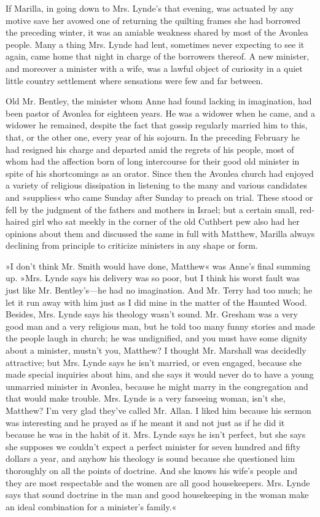 If Marilla, in going down to Mrs. Lynde's that evening, was actuated by any motive save her avowed one of returning the quilting frames she had borrowed the preceding winter, it was an amiable weakness shared by most of the Avonlea people. Many a thing Mrs. Lynde had lent, sometimes never expecting to see it again, came home that night in charge of the borrowers thereof. A new minister, and moreover a minister with a wife, was a lawful object of curiosity in a quiet little country settlement where sensations were few and far between.

Old Mr. Bentley, the minister whom Anne had found lacking in imagination, had been pastor of Avonlea for eighteen years. He was a widower when he came, and a widower he remained, despite the fact that gossip regularly married him to this, that, or the other one, every year of his sojourn. In the preceding February he had resigned his charge and departed amid the regrets of his people, most of whom had the affection born of long intercourse for their good old minister in spite of his shortcomings as an orator. Since then the Avonlea church had enjoyed a variety of religious dissipation in listening to the many and various candidates and »supplies« who came Sunday after Sunday to preach on trial. These stood or fell by the judgment of the fathers and mothers in Israel; but a certain small, red-haired girl who sat meekly in the corner of the old Cuthbert pew also had her opinions about them and discussed the same in full with Matthew, Marilla always declining from principle to criticize ministers in any shape or form.

»I don't think Mr. Smith would have done, Matthew« was Anne's final summing up. »Mrs. Lynde says his delivery was so poor, but I think his worst fault was just like Mr. Bentley's—he had no imagination. And Mr. Terry had too much; he let it run away with him just as I did mine in the matter of the Haunted Wood. Besides, Mrs. Lynde says his theology wasn't sound. Mr. Gresham was a very good man and a very religious man, but he told too many funny stories and made the people laugh in church; he was undignified, and you must have some dignity about a minister, mustn't you, Matthew? I thought Mr. Marshall was decidedly attractive; but Mrs. Lynde says he isn't married, or even engaged, because she made special inquiries about him, and she says it would never do to have a young unmarried minister in Avonlea, because he might marry in the congregation and that would make trouble. Mrs. Lynde is a very farseeing woman, isn't she, Matthew? I'm very glad they've called Mr. Allan. I liked him because his sermon was interesting and he prayed as if he meant it and not just as if he did it because he was in the habit of it. Mrs. Lynde says he isn't perfect, but she says she supposes we couldn't expect a perfect minister for seven hundred and fifty dollars a year, and anyhow his theology is sound because she questioned him thoroughly on all the points of doctrine. And she knows his wife's people and they are most respectable and the women are all good housekeepers. Mrs. Lynde says that sound doctrine in the man and good housekeeping in the woman make an ideal combination for a minister's family.«

